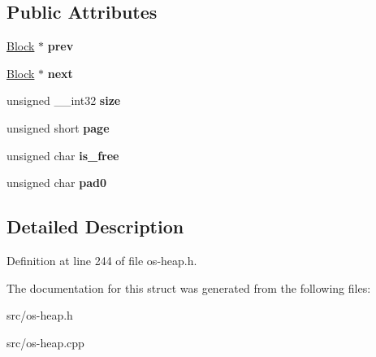 \subsection*{Public Attributes}
\begin{DoxyCompactItemize}
\item 
\hyperlink{struct_object_script_1_1_o_s_heap_manager_1_1_block}{Block} $\ast$ {\bfseries prev}\hypertarget{struct_object_script_1_1_o_s_heap_manager_1_1_block_a33d94204514b9970f07b74832e95445a}{}\label{struct_object_script_1_1_o_s_heap_manager_1_1_block_a33d94204514b9970f07b74832e95445a}

\item 
\hyperlink{struct_object_script_1_1_o_s_heap_manager_1_1_block}{Block} $\ast$ {\bfseries next}\hypertarget{struct_object_script_1_1_o_s_heap_manager_1_1_block_a5b861890e4f0dc2b1c8c2b59f65259d4}{}\label{struct_object_script_1_1_o_s_heap_manager_1_1_block_a5b861890e4f0dc2b1c8c2b59f65259d4}

\item 
unsigned \+\_\+\+\_\+int32 {\bfseries size}\hypertarget{struct_object_script_1_1_o_s_heap_manager_1_1_block_a5338cd5498c993ecfab9215a4006c507}{}\label{struct_object_script_1_1_o_s_heap_manager_1_1_block_a5338cd5498c993ecfab9215a4006c507}

\item 
unsigned short {\bfseries page}\hypertarget{struct_object_script_1_1_o_s_heap_manager_1_1_block_a0f67fed5b88bce668e8c861352b5dc17}{}\label{struct_object_script_1_1_o_s_heap_manager_1_1_block_a0f67fed5b88bce668e8c861352b5dc17}

\item 
unsigned char {\bfseries is\+\_\+free}\hypertarget{struct_object_script_1_1_o_s_heap_manager_1_1_block_a26dd0903c6768f0817099344dbb764fb}{}\label{struct_object_script_1_1_o_s_heap_manager_1_1_block_a26dd0903c6768f0817099344dbb764fb}

\item 
unsigned char {\bfseries pad0}\hypertarget{struct_object_script_1_1_o_s_heap_manager_1_1_block_a6b3164f18f6e01dc53db280912dff7c8}{}\label{struct_object_script_1_1_o_s_heap_manager_1_1_block_a6b3164f18f6e01dc53db280912dff7c8}

\end{DoxyCompactItemize}


\subsection{Detailed Description}


Definition at line 244 of file os-\/heap.\+h.



The documentation for this struct was generated from the following files\+:\begin{DoxyCompactItemize}
\item 
src/os-\/heap.\+h\item 
src/os-\/heap.\+cpp\end{DoxyCompactItemize}
